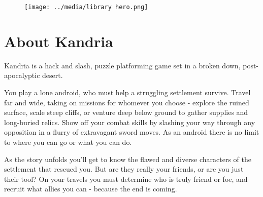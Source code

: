 \begin{figure}[H]
  \centering
  \vspace{-1.5cm}
  \advance\leftskip-1.8cm
  \texttt{[image: ../media/library hero.png]}
\end{figure}

\section{About Kandria}
Kandria is a hack and slash, puzzle platforming game set in a broken down, post-apocalyptic desert.

You play a lone android, who must help a struggling settlement survive. Travel far and wide, taking on missions for whomever you choose - explore the ruined surface, scale steep cliffs, or venture deep below ground to gather supplies and long-buried relics. Show off your combat skills by slashing your way through any opposition in a flurry of extravagant sword moves. As an android there is no limit to where you can go or what you can do.

As the story unfolds you’ll get to know the flawed and diverse characters of the settlement that rescued you. But are they really your friends, or are you just their tool? On your travels you must determine who is truly friend or foe, and recruit what allies you can - because the end is coming.

